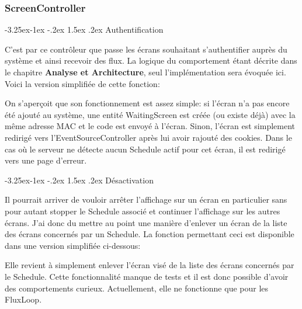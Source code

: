 \documentclass[french]{article}
\makeatletter
\renewcommand\paragraph{\@startsection{paragraph}{4}{\z@}%
                                     {-3.25ex\@plus -1ex \@minus -.2ex}%
                                     {1.5ex \@plus .2ex}%
                                     {\normalfont\normalsize\bfseries}}
\makeatother
\begin{document}


\subsubsection{ScreenController}

\paragraph{Authentification}

C'est par ce contrôleur que passe les écrans souhaitant s'authentifier auprès du système et ainsi recevoir des flux. La logique du comportement étant décrite dans le chapitre \textbf{Analyse et Architecture}, seul l'implémentation sera évoquée ici. \newline
Voici la version simplifiée de cette fonction:


On s'aperçoit que son fonctionnement est assez simple: si l'écran n'a pas encore été ajouté au système, une entité WaitingScreen est créée (ou existe déjà) avec la même adresse MAC et le code est envoyé à l'écran. Sinon, l'écran est simplement redirigé vers l'EventSourceController après lui avoir rajouté des cookies. Dans le cas où le serveur ne détecte aucun Schedule actif pour cet écran, il est redirigé vers une page d'erreur.

\paragraph{Désactivation}

Il pourrait arriver de vouloir arrêter l'affichage sur un écran en particulier sans pour autant stopper le Schedule associé et continuer l'affichage sur les autres écrans. J'ai donc du mettre au point une manière d'enlever un écran de la liste des écrans concernés par un Schedule. La fonction permettant ceci est disponible dans une version simplifiée ci-dessous: 

\newpage


Elle revient à simplement enlever l'écran visé de la liste des écrans concernés par le Schedule. Cette fonctionnalité manque de tests et il est donc possible d'avoir des comportements curieux. Actuellement, elle ne fonctionne que pour les FluxLoop.
\end{document}
